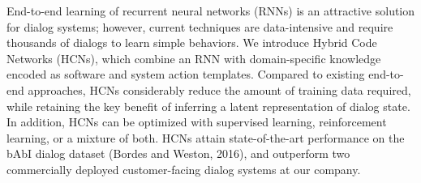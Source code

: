 End-to-end learning of recurrent neural networks (RNNs) is an attractive solution for dialog systems; however, current techniques are data-intensive and require thousands of dialogs to learn simple behaviors.  We introduce Hybrid Code Networks (HCNs), which combine an RNN with domain-specific knowledge encoded as software and system action templates. Compared to existing end-to-end approaches, HCNs considerably reduce the amount of training data required, while retaining the key benefit of inferring a latent representation of dialog state. In addition, HCNs can be optimized with supervised learning, reinforcement learning, or a mixture of both. HCNs attain state-of-the-art performance on the bAbI dialog dataset (Bordes and Weston, 2016), and outperform two commercially deployed customer-facing dialog systems at our company.
